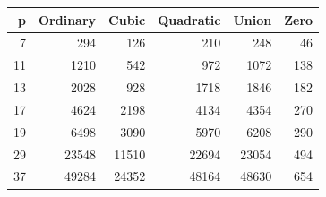\begin{tabular}{rrrrrr}\toprule
p & Ordinary & Cubic & Quadratic & Union & Zero\\\midrule
7 & 294 & 126 & 210 & 248 & 46\\
11 & 1210 & 542 & 972 & 1072 & 138\\
13 & 2028 & 928 & 1718 & 1846 & 182\\
17 & 4624 & 2198 & 4134 & 4354 & 270\\
19 & 6498 & 3090 & 5970 & 6208 & 290\\
29 & 23548 & 11510 & 22694 & 23054 & 494\\
37 & 49284 & 24352 & 48164 & 48630 & 654\\
\bottomrule\end{tabular}
